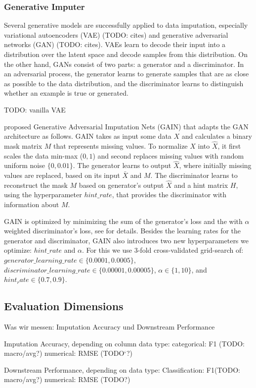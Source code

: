 \subsubsection{Generative Imputer}
%
Several generative models are successfully applied to data imputation, especially variational autoencoders (VAE) (TODO: cites) and generative adversarial networks (GAN) (TODO: cites). VAEs learn to decode their input into a distribution over the latent space and decode samples from this distribution. On the other hand, GANs consist of two parts: a generator and a discriminator. In an adversarial process, the generator learns to generate samples that are as close as possible to the data distribution, and the discriminator learns to distinguish whether an example is true or generated.

TODO: vanilla VAE

\cite{GAIN} proposed Generative Adversarial Imputation Nets (GAIN) that adapts the GAN architecture as follows. GAIN takes as input some data $X$ and calculates a binary mask matrix $M$ that represents missing values. To normalize $X$ into $\hat{X}$, it first scales the data min-max ($0, 1$) and second replaces missing values with random uniform noise $\{0, 0.01\}$. The generator learns to output $\hat{X}$, where initially missing values are replaced, based on its input $\bar{X}$ and $M$. The discriminator learns to reconstruct the mask $M$ based on generator's output $\hat{X}$ and a hint matrix $H$, using the hyperparameter $hint\_rate$, that provides the discriminator with information about $M$.

GAIN is optimized by minimizing the sum of the generator's loss and the with $\alpha$ weighted discriminator's loss, see \cite{GAIN} for details. Besides the learning rates for the generator and discriminator, GAIN also introduces two new hyperparameters we optimize: $hint\_rate$ and $\alpha$. For this we use 3-fold cross-validated grid-search of: $generator\_learning\_rate \in \{0.0001, 0.0005\}$, $discriminator\_learning\_rate \in \{0.00001, 0.00005\}$, $\alpha \in \{1, 10\}$, and $hint_rate \in \{0.7, 0.9\}$.


\subsection{Evaluation Dimensions}
%

Was wir messen:
Imputation Accuracy und Downstream Performance

Imputation Accuracy, depending on column data type:
categorical: F1 (TODO: macro/avg?)
numerical: RMSE (TODO`?)

Downstream Performance, depending on data type:
Classification: F1(TODO: macro/avg?)
numerical: RMSE (TODO?)
